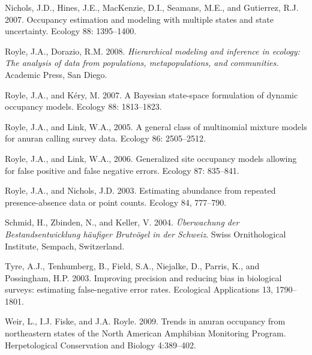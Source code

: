 \documentclass[12pt]{article}
\begin{document}
\rf Nichols, J.D., Hines, J.E., MacKenzie, D.I., Seamans, M.E., and
Gutierrez, R.J. 2007. Occupancy estimation and modeling with multiple
states and state uncertainty. Ecology 88: 1395--1400.

\rf Royle, J.A., Dorazio, R.M. 2008. \emph{Hierarchical modeling and
  inference in ecology: The analysis of data from populations,
  metapopulations, and communities}. Academic Press, San Diego.

\rf Royle, J.A.,  and K\'{e}ry, M. 2007. A Bayesian state-space
formulation of dynamic occupancy models. Ecology 88: 1813--1823.

\rf Royle, J.A., and Link, W.A., 2005. A general class of multinomial
mixture models for anuran calling survey data. Ecology 86:
2505--2512.

\rf Royle, J.A., and Link, W.A., 2006. Generalized site occupancy
models allowing for false positive and false negative errors. Ecology
87: 835--841.

\rf Royle, J.A., and Nichols, J.D. 2003. Estimating abundance from
repeated presence-absence data or point counts. Ecology 84, 777--790.

\rf Schmid, H., Zbinden, N., and Keller,
V. 2004. \emph{\"{U}berwachung der Bestandsentwicklung h\"{a}ufiger
  Brutv\"{o}gel in der Schweiz}. Swiss Ornithological Institute,
Sempach, Switzerland.

\rf Tyre, A.J., Tenhumberg, B., Field, S.A., Niejalke, D., Parris, K.,
and Possingham, H.P. 2003. Improving precision and reducing bias in
biological surveys: estimating false-negative error rates. Ecological
Applications 13, 1790--1801.

\rf Weir, L., I.J. Fiske, and J.A. Royle. 2009. Trends in anuran
occupancy from northeastern states of the North American Amphibian
Monitoring Program. Herpetological Conservation and Biology
4:389--402.
\end{document}
